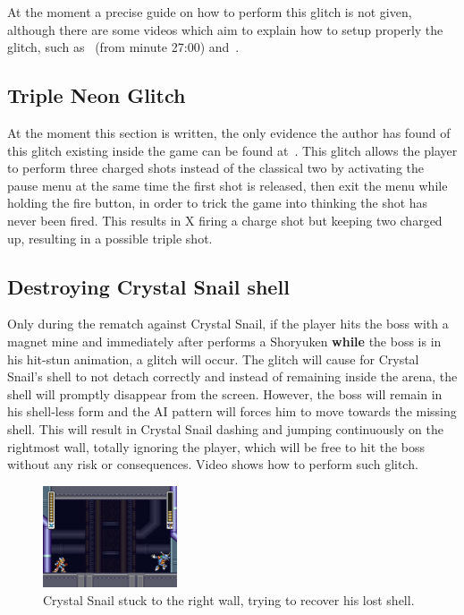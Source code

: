 At the moment a precise guide on how to perform this glitch is not given, although there are some videos which aim to explain how to setup properly the glitch, such as~\cite{video:tail_spin_1} (from minute 27:00) and~\cite{video:tail_spin_2}.

\subsection{Triple Neon Glitch}
At the moment this section is written, the only evidence the author has found of this glitch existing inside the game can be found at~\cite{video:triple_glitch}. This glitch allows the player to perform three charged shots instead of the classical two by activating the pause menu at the same time the first shot is released, then exit the menu while holding the fire button, in order to trick the game into thinking the shot has never been fired. This results in X firing a charge shot but keeping two charged up, resulting in a possible triple shot.


\subsection{Destroying Crystal Snail shell}
Only during the rematch against Crystal Snail, if the player hits the boss with a magnet mine and immediately after performs a Shoryuken \textbf{while} the boss is in his hit-stun animation, a glitch will occur. The glitch will cause for Crystal Snail's shell to not detach correctly and  instead of remaining inside the arena, the shell will promptly disappear from the screen. However, the boss will remain in his shell-less form and the AI pattern will forces him to move towards the missing shell. This will result in Crystal Snail dashing and jumping continuously on the rightmost wall, totally ignoring the player, which will be free to hit the boss without any risk or consequences. Video  shows how to perform such glitch.
\begin{figure}[htp]
	\centering
	\includegraphics[height=3cm]{figures/X2/Crystal_snail/snail_shell_glitch.png}
	\caption{Crystal Snail stuck to the right wall, trying to recover his lost shell.}
\end{figure}


